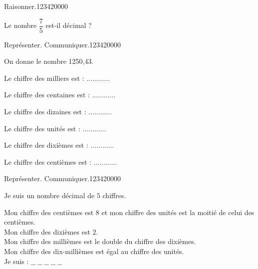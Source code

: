 \begin{pageAD}
\begin{minipage}{0.58\linewidth}
\end{minipage}
\begin{minipage}{0.38\linewidth}

\begin{ExoCad}{Raisonner.}{1234}{2}{0}{0}{0}{0}


Le nombre $\dfrac{7}{5}$ est-il décimal ?
 
\end{ExoCad}

 
\end{minipage}

\vspace{0.5cm}



\begin{minipage}{0.48\linewidth}

 

\begin{ExoCad}{Représenter. Communiquer.}{1234}{2}{0}{0}{0}{0}

On donne le  nombre 1250,43. 
\begin{description}
\item Le chiffre des milliers est : $ \ldots\ldots\ldots\ldots $
\item Le chiffre des centaines est : $ \ldots\ldots\ldots\ldots $
\item Le chiffre des dizaines est : $ \ldots\ldots\ldots\ldots $
\item Le chiffre des unités est : $ \ldots\ldots\ldots\ldots $
\item Le chiffre des dixièmes est : $ \ldots\ldots\ldots\ldots $
\item Le chiffre des centièmes est : $ \ldots\ldots\ldots\ldots $
\end{description}
 \end{ExoCad}
 
\end{minipage}\hfill
\begin{minipage}{0.48\linewidth}

\begin{ExoCad}{Représenter. Communiquer.}{1234}{2}{0}{0}{0}{0}
 
Je suis un nombre décimal de $5$ chiffres.

Mon chiffre des centièmes est $8$ et mon chiffre des unités est la moitié de celui des centièmes.\\
Mon chiffre des dixièmes est $2$. \\
Mon chiffre des millièmes est le double du chiffre des dixièmes.\\
Mon chiffre des dix-millièmes est égal au chiffre des unités. \\ 
Je suis : $  \_\_\; \_\_\; \_\_\; \_\_\; \_\_\; $
 \end{ExoCad}
\end{minipage}

\end{pageAD}  


